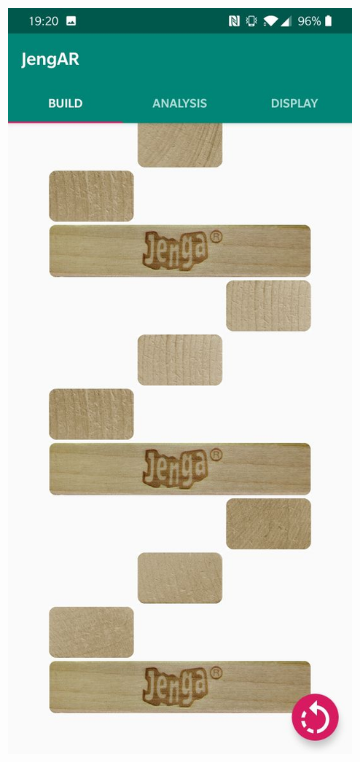 \begin{figure}[ht]
\hspace*{\fill}
\begin{subfigure}{0.3\textwidth}
\includegraphics[width=\linewidth]{images/evaluation/uibug.jpg}

\end{subfigure}
\end{figure}
